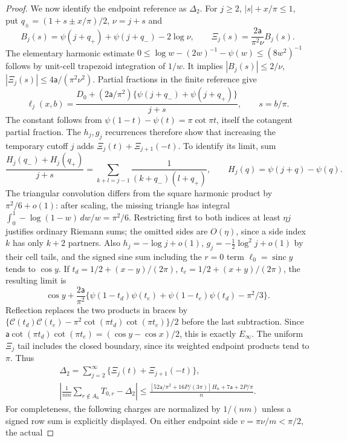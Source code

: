 \begin{proof}
We now identify the endpoint reference as $\Delta_2$. For $j\geq2$, $|s|+x/\pi\leq1$,
put $q_\pm=(1+s\pm x/\pi)/2$, $\nu=j+s$ and
\[
 B_j(s)=\psi(j+q_+)+\psi(j+q_-)-2\log\nu,\qquad
 \Xi_j(s)=\frac{2\mathsf{a}}{\pi^2\nu}B_j(s).
\]
The elementary harmonic estimate
$0\leq\log w-(2w)^{-1}-\psi(w)\leq(8w^2)^{-1}$ follows by
unit-cell trapezoid integration of $1/w$. It implies
$|B_j(s)|\leq2/\nu$, $|\Xi_j(s)|\leq4\mathsf{a}/(\pi^2\nu^2)$.
Partial fractions in the finite reference give
\[
 \ell_j(x,b)=\frac{D_0+(2\mathsf{a}/\pi^2)
                \{\psi(j+q_-)+\psi(j+q_+)\}}{j+s},\qquad s=b/\pi.
\]
The constant follows from
$\psi(1-t)-\psi(t)=\pi\cot\pi t$, itself the cotangent partial
fraction. The $h_j,g_j$ recurrences therefore show that increasing
the temporary cutoff $j$ adds $\Xi_j(t)+\Xi_{j+1}(-t)$.
To identify its limit, sum
\[
 \frac{H_j(q_-)+H_j(q_+)}{j+s}
 =\sum_{k+l=j-1}\frac1{(k+q_-)(l+q_+)},\qquad
 H_j(q)=\psi(j+q)-\psi(q).
\]
The triangular convolution differs from the square harmonic product by
$\pi^2/6+o(1)$: after scaling, the missing triangle has integral
$\int_0^1-\log(1-w)\,dw/w=\pi^2/6$. Restricting first to both
indices at least $\eta j$ justifies ordinary Riemann sums; the omitted
sides are $O(\eta)$, since a side index $k$ has only $k+2$ partners.
Also $h_j=-\log j+o(1)$, $g_j=-\tfrac12\log^2j+o(1)$ by their
cell tails, and the signed sine sum including the $r=0$ term
$\ell_0=\operatorname{sinc}y$ tends to
$\cos y$. If $t_d=1/2+(x-y)/(2\pi)$,
$t_e=1/2+(x+y)/(2\pi)$, the resulting limit is
\[
 \cos y+\frac{2\mathsf{a}}{\pi^2}
 \{\psi(1-t_d)\psi(t_e)+\psi(1-t_e)\psi(t_d)-\pi^2/3\}.
\]
Reflection replaces the two products in braces by
$\{\mathcal C(t_d)\mathcal C(t_e)-\pi^2\cot(\pi t_d)
\cot(\pi t_e)\}/2$ before the last subtraction.
Since $\mathsf{a}\cot(\pi t_d)\cot(\pi t_e)=(\cos y-\cos x)/2$,
this is exactly $E_\infty$.
The uniform $\Xi_j$ tail includes the closed boundary, since its
weighted endpoint products tend to $\pi$. Thus
\begin{equation}\label{uc:reference-match}
 \begin{gathered}
 \Delta_2=\sum_{j=2}^\infty\{\Xi_j(t)+\Xi_{j+1}(-t)\},\\
 \left|\frac1{nm}\sum_{r\notin A_6}T_{0,r}-\Delta_2\right|
 \leq\frac{[52\mathsf{a}/\pi^2+16P/(3\pi)]H_n+7\mathsf{a}+2P/\pi}{n}.
 \end{gathered}
\end{equation}
For completeness, the following charges are normalized by $1/(nm)$
unless a signed row sum is explicitly displayed. On either endpoint side $v=\pi\nu/m<\pi/2$, the actual

\end{proof}
